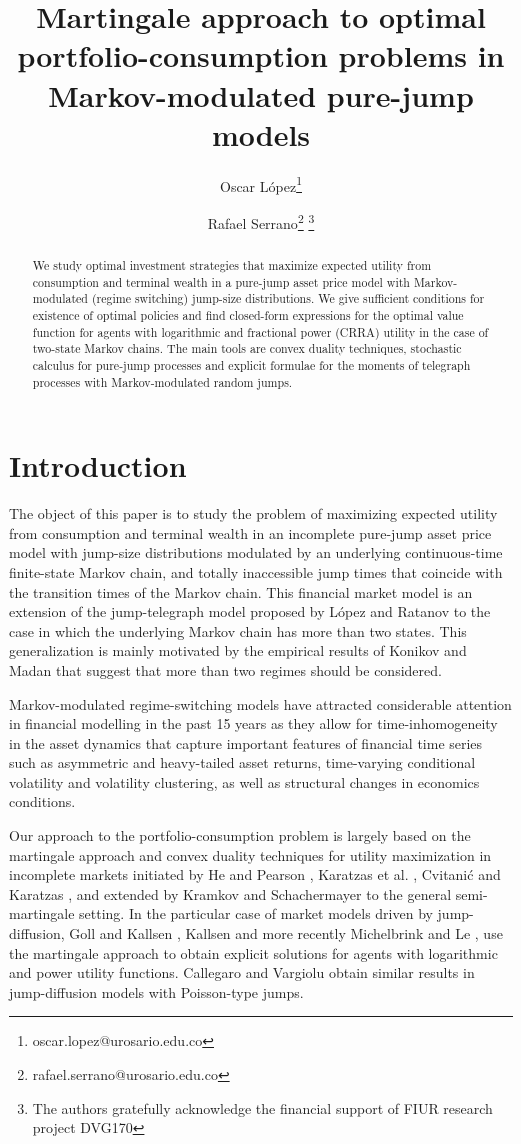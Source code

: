 \documentclass[11pt]{article}
\title{Martingale approach to optimal portfolio-consumption problems in Markov-modulated pure-jump models}
\author{\large Oscar L\'opez\thanks{oscar.lopez@urosario.edu.co} }
\author{\large Rafael Serrano\thanks{rafael.serrano@urosario.edu.co} \thanks{The authors gratefully acknowledge the financial support of FIUR research project  DVG170}}
\affil{\small Universidad del Rosario\\
Calle 12C No. 4-69\\
Bogot\'a, Colombia}
\theoremstyle{plain}
\theoremstyle{definition}
\numberwithin{equation}{section}
\begin{document}

\maketitle

\begin{abstract}
  We study optimal investment strategies that maximize expected utility from consumption and terminal wealth in a pure-jump asset price model with Markov-modulated (regime switching) jump-size distributions. We give sufficient conditions for existence of optimal policies and find closed-form expressions for the optimal value function for agents with logarithmic and fractional power (CRRA) utility in the case of two-state Markov chains. The main tools are convex duality techniques, stochastic calculus for pure-jump processes and explicit formulae for the moments of telegraph processes with Markov-modulated random jumps.

\end{abstract}
\section{Introduction}
The object of this paper is to study the problem of maximizing expected utility from consumption and terminal wealth in an incomplete pure-jump asset price model with jump-size distributions modulated by an underlying continuous-time finite-state Markov chain, and totally inaccessible jump times that coincide with the transition times of the Markov chain. This financial market model is an extension of the jump-telegraph model proposed by L\'opez and Ratanov \cite{lopezrat} to the case in which the underlying Markov chain has more than two states. This generalization is mainly motivated by the empirical results of Konikov and Madan \cite{konmadan} that suggest that more than two regimes should be considered.

Markov-modulated regime-switching models have attracted considerable attention in financial modelling in the past 15 years as they allow for time-inhomogeneity in the asset dynamics that capture important features of financial time series such as asymmetric and heavy-tailed asset returns, time-varying conditional volatility and volatility clustering, as well as structural changes in economics conditions.

Our approach to the portfolio-consumption problem is largely based on the martingale approach and convex duality techniques for utility maximization in incomplete markets initiated by He and Pearson \cite{hepearson}, Karatzas et al. \cite{karatzas91}, Cvitani\'{c} and Karatzas \cite{cvikar}, and extended by Kramkov and Schachermayer \cite{kramsch} to the general semi-martingale setting. In the particular case of market models driven by jump-diffusion, Goll and Kallsen \cite{goll2000}, Kallsen \cite{kallsen2000} and more recently Michelbrink and Le \cite{michelbrink}, use the martingale approach to obtain explicit solutions for agents with logarithmic and power utility functions. Callegaro and Vargiolu \cite{callevar} obtain similar results in jump-diffusion models with Poisson-type jumps.
\end{document}
